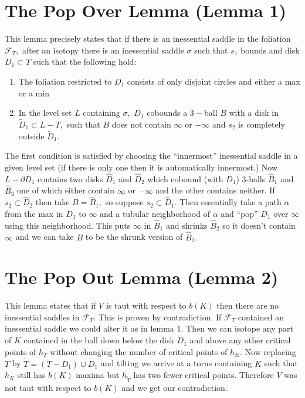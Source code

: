 \documentclass[11pt, oneside]{article}
\begin{document}
\section*{The Pop Over Lemma (Lemma 1)}
This lemma precisely states that if there is an inessential saddle in the foliation $\mathcal{F}_{T},$ after an isotopy there is an inessential saddle $\sigma$ such that $s_{1}$ bounds and disk $D_{1} \subset T$ such that the following hold:
\begin{enumerate}
\item The foliation restricted to $D_{1}$ consists of only disjoint circles and either a max or a min
\item In the level set $L$ containing $\sigma,$ $D_{1}$ cobounds a $3-$ball $B$ with a disk in $\tilde{D}_{1} \subset L - T,$ such that $B$ does not contain $\infty$ or $-\infty$ and $s_{2}$ is completely outside $\tilde{D}_{1}.$
\end{enumerate} The first condition is satisfied by choosing the ``innermost'' inessential saddle in a given level set (if there is only one then it is automatically innermost.) Now $L - \partial D_{1}$ contains two disks $\hat{D}_{1}$ and $\hat{D}_{2}$ which cobound (with $D_{1}$) 3-balls $\hat{B}_{1}$ and $\hat{B}_{3}$ one of which either contain $\infty$ or $-\infty$ and the other contains neither. If $s_{2} \subset \hat{D}_{2}$ then take $B = \hat{B}_{1},$ so suppose $s_{2} \subset \hat{D}_{1}.$ Then essentially take a path $\alpha$ from the max in $D_{1}$ to $\infty$ and a tubular neighborhood of $\alpha$ and ``pop'' $D_{1}$ over $\infty$ using this neighborhood. This puts $\infty$ in $\hat{B}_{1}$ and shrinks $\hat{B}_{2}$ so it doesn't contain $\infty$ and we can take $B$ to be the shrunk version of $\hat{B}_{2}.$  



\section*{The Pop Out Lemma (Lemma 2)}
This lemma states that if $V$ is taut with respect to $b(K)$ then there are no inessential saddles in $\mathcal{F}_{T}.$ \newline \newline This is proven by contradiction. If $\mathcal{F}_{T}$ contained an inessential saddle we could alter it as in lemma 1. Then we can isotope any part of $K$ contained in the ball down below the disk $\tilde{D}_{1}$ and above any other critical points of $h_{T}$ without changing the number of critical points of $h_{K}.$ Now replacing $T$ by $\tilde{T} = (T - D_{1}) \cup \tilde{D}_{1}$ and tilting  we arrive at a torus containing $K$ such that $h_{K}$ still has $b(K)$ maxima but $h_{\tilde{T}}$ has two fewer critical points. Therefore $V$ was not taut with respect to $b(K)$ and we get our contradiction.
\end{document}
